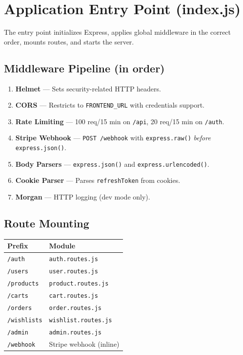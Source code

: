 \section{Application Entry Point (index.js)}

The entry point initializes Express, applies global middleware in the correct order, mounts routes, and starts the server.

\subsection{Middleware Pipeline (in order)}
\begin{enumerate}
  \item \textbf{Helmet} --- Sets security-related HTTP headers.
  \item \textbf{CORS} --- Restricts to \texttt{FRONTEND\_URL} with credentials support.
  \item \textbf{Rate Limiting} --- 100 req/15 min on \texttt{/api}, 20 req/15 min on \texttt{/auth}.
  \item \textbf{Stripe Webhook} --- \texttt{POST /webhook} with \texttt{express.raw()} \emph{before} \texttt{express.json()}.
  \item \textbf{Body Parsers} --- \texttt{express.json()} and \texttt{express.urlencoded()}.
  \item \textbf{Cookie Parser} --- Parses \texttt{refreshToken} from cookies.
  \item \textbf{Morgan} --- HTTP logging (dev mode only).
\end{enumerate}

\subsection{Route Mounting}
\begin{longtable}{@{}ll@{}}
  \toprule
  \textbf{Prefix} & \textbf{Module} \\
  \midrule
  \texttt{/auth}      & \texttt{auth.routes.js} \\
  \texttt{/users}     & \texttt{user.routes.js} \\
  \texttt{/products}  & \texttt{product.routes.js} \\
  \texttt{/carts}     & \texttt{cart.routes.js} \\
  \texttt{/orders}    & \texttt{order.routes.js} \\
  \texttt{/wishlists} & \texttt{wishlist.routes.js} \\
  \texttt{/admin}     & \texttt{admin.routes.js} \\
  \texttt{/webhook}   & Stripe webhook (inline) \\
  \bottomrule
\end{longtable}

